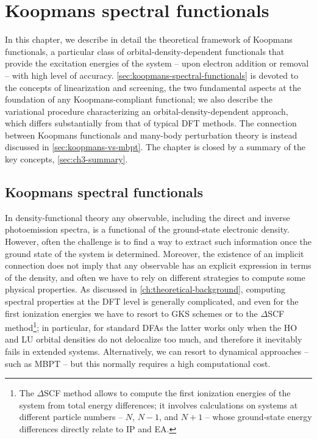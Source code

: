 \cleardoublepage
\chapter{Koopmans spectral functionals\label{ch:koopmans-theory}}

In this chapter, we describe in detail the theoretical framework of Koopmans functionals, a particular class of orbital-density-dependent functionals that provide the excitation energies of the system -- upon electron addition or removal -- with high level of accuracy. \cref{sec:koopmans-spectral-functionals} is devoted to the concepts of linearization and screening, the two fundamental aspects at the foundation of any Koopmans-compliant functional; we also describe the variational procedure characterizing an orbital-density-dependent approach, which differs substantially from that of typical DFT methods. The connection between Koopmans functionals and many-body perturbation theory is instead discussed in \cref{sec:koopmans-vs-mbpt}. The chapter is closed by a summary of the key concepts, \cref{sec:ch3-summary}.

\clearpage
\section{Koopmans spectral functionals\label{sec:koopmans-spectral-functionals}}
In density-functional theory any observable, including the direct and inverse photoemission spectra, is a functional of the ground-state electronic density. However, often the challenge is to find a way to extract such information once the ground state of the system is determined. Moreover, the existence of an implicit connection does not imply that any observable has an explicit expression in terms of the density, and often we have to rely on different strategies to compute some physical properties. As discussed in \cref{ch:theoretical-background}, computing spectral properties at the DFT level is generally complicated, and even for the first ionization energies we have to resort to GKS schemes or to the $\Delta$SCF method\footnote{The $\Delta$SCF method allows to compute the first ionization energies of the system from total energy differences; it involves calculations on systems at different particle numbers -- $N$, $N-1$, and $N+1$ -- whose ground-state energy differences directly relate to IP and EA.}; in particular, for standard DFAs the latter works only when the HO and LU orbital densities do not delocalize too much, and therefore it inevitably fails in extended systems. Alternatively, we can resort to dynamical approaches -- such as MBPT -- but this normally requires a high computational cost.

